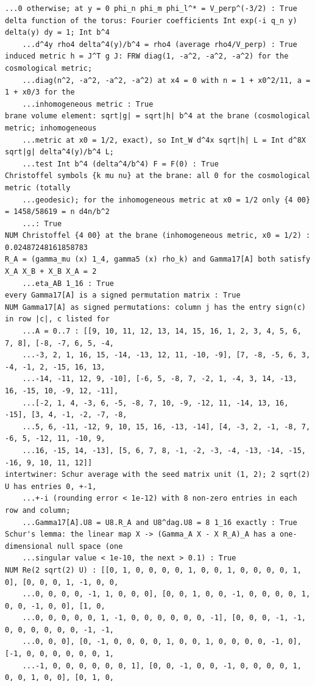 \documentclass[10pt,a4paper]{article}
\begin{document}
\begin{Verbatim}[fontsize=\small,frame=single,framesep=2mm]
    ...0 otherwise; at y = 0 phi_n phi_m phi_l^* = V_perp^(-3/2) : True
delta function of the torus: Fourier coefficients Int exp(-i q_n y) delta(y) dy = 1; Int b^4
    ...d^4y rho4 delta^4(y)/b^4 = rho4 (average rho4/V_perp) : True
induced metric h = J^T g J: FRW diag(1, -a^2, -a^2, -a^2) for the cosmological metric;
    ...diag(n^2, -a^2, -a^2, -a^2) at x4 = 0 with n = 1 + x0^2/11, a = 1 + x0/3 for the
    ...inhomogeneous metric : True
brane volume element: sqrt|g| = sqrt|h| b^4 at the brane (cosmological metric; inhomogeneous
    ...metric at x0 = 1/2, exact), so Int_W d^4x sqrt|h| L = Int d^8X sqrt|g| delta^4(y)/b^4 L;
    ...test Int b^4 (delta^4/b^4) F = F(0) : True
Christoffel symbols {k mu nu} at the brane: all 0 for the cosmological metric (totally
    ...geodesic); for the inhomogeneous metric at x0 = 1/2 only {4 00} = 1458/58619 = n d4n/b^2
    ...: True
NUM Christoffel {4 00} at the brane (inhomogeneous metric, x0 = 1/2) : 0.02487248161858783
R_A = (gamma_mu (x) 1_4, gamma5 (x) rho_k) and Gamma17[A] both satisfy X_A X_B + X_B X_A = 2
    ...eta_AB 1_16 : True
every Gamma17[A] is a signed permutation matrix : True
NUM Gamma17[A] as signed permutations: column j has the entry sign(c) in row |c|, c listed for
    ...A = 0..7 : [[9, 10, 11, 12, 13, 14, 15, 16, 1, 2, 3, 4, 5, 6, 7, 8], [-8, -7, 6, 5, -4,
    ...-3, 2, 1, 16, 15, -14, -13, 12, 11, -10, -9], [7, -8, -5, 6, 3, -4, -1, 2, -15, 16, 13,
    ...-14, -11, 12, 9, -10], [-6, 5, -8, 7, -2, 1, -4, 3, 14, -13, 16, -15, 10, -9, 12, -11],
    ...[-2, 1, 4, -3, 6, -5, -8, 7, 10, -9, -12, 11, -14, 13, 16, -15], [3, 4, -1, -2, -7, -8,
    ...5, 6, -11, -12, 9, 10, 15, 16, -13, -14], [4, -3, 2, -1, -8, 7, -6, 5, -12, 11, -10, 9,
    ...16, -15, 14, -13], [5, 6, 7, 8, -1, -2, -3, -4, -13, -14, -15, -16, 9, 10, 11, 12]]
intertwiner: Schur average with the seed matrix unit (1, 2); 2 sqrt(2) U has entries 0, +-1,
    ...+-i (rounding error < 1e-12) with 8 non-zero entries in each row and column;
    ...Gamma17[A].U8 = U8.R_A and U8^dag.U8 = 8 1_16 exactly : True
Schur's lemma: the linear map X -> (Gamma_A X - X R_A)_A has a one-dimensional null space (one
    ...singular value < 1e-10, the next > 0.1) : True
NUM Re(2 sqrt(2) U) : [[0, 1, 0, 0, 0, 0, 1, 0, 0, 1, 0, 0, 0, 0, 1, 0], [0, 0, 0, 1, -1, 0, 0,
    ...0, 0, 0, 0, -1, 1, 0, 0, 0], [0, 0, 1, 0, 0, -1, 0, 0, 0, 0, 1, 0, 0, -1, 0, 0], [1, 0,
    ...0, 0, 0, 0, 0, 1, -1, 0, 0, 0, 0, 0, 0, -1], [0, 0, 0, -1, -1, 0, 0, 0, 0, 0, 0, -1, -1,
    ...0, 0, 0], [0, -1, 0, 0, 0, 0, 1, 0, 0, 1, 0, 0, 0, 0, -1, 0], [-1, 0, 0, 0, 0, 0, 0, 1,
    ...-1, 0, 0, 0, 0, 0, 0, 1], [0, 0, -1, 0, 0, -1, 0, 0, 0, 0, 1, 0, 0, 1, 0, 0], [0, 1, 0,

\end{Verbatim}
\end{document}
